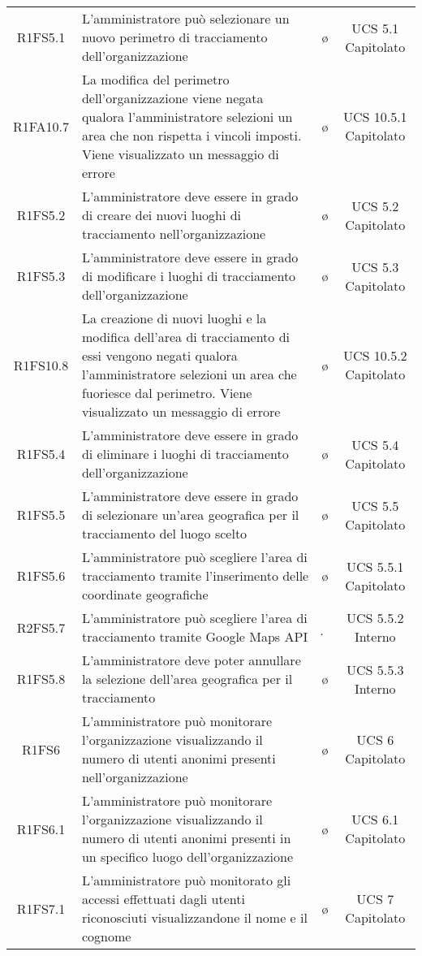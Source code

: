 {\begin{longtable}{ c C{4cm} c c}

R1FS5.1 & L'amministratore può selezionare un nuovo perimetro di tracciamento dell'organizzazione & \o & UCS 5.1 Capitolato\\
R1FA10.7 & La modifica del perimetro dell'organizzazione viene negata qualora l'amministratore selezioni un area che non rispetta i vincoli imposti. Viene visualizzato un messaggio di errore & \o & UCS 10.5.1 Capitolato \\
R1FS5.2 & L'amministratore deve essere in grado di creare dei nuovi luoghi di tracciamento nell'organizzazione & \o & UCS 5.2 Capitolato\\
R1FS5.3 & L'amministratore deve essere in grado di modificare i luoghi di tracciamento dell'organizzazione  & \o & UCS 5.3 Capitolato\\
R1FS10.8 & La creazione di nuovi luoghi e la modifica dell'area di tracciamento di essi vengono negati qualora l'amministratore selezioni un area che fuoriesce dal perimetro. Viene visualizzato un messaggio di errore & \o & UCS 10.5.2 Capitolato \\
R1FS5.4 & L'amministratore deve essere in grado di eliminare i luoghi di tracciamento dell'organizzazione  & \o & UCS 5.4 Capitolato\\
R1FS5.5 & L'amministratore deve essere in grado di selezionare un'area geografica per il tracciamento del luogo scelto  & \o & UCS 5.5 Capitolato\\
R1FS5.6 &  L'amministratore può scegliere l'area di tracciamento tramite l'inserimento delle coordinate geografiche & \o & UCS 5.5.1 Capitolato\\
R2FS5.7 & L'amministratore può scegliere l'area di tracciamento tramite Google Maps API & \d & UCS 5.5.2 Interno\\
R1FS5.8 & L'amministratore deve poter annullare la selezione dell'area geografica per il tracciamento & \o & UCS 5.5.3 Interno\\
R1FS6 & L'amministratore può monitorare l'organizzazione visualizzando il numero di utenti anonimi presenti nell'organizzazione & \o & UCS 6 Capitolato\\
R1FS6.1 & L'amministratore può monitorare l'organizzazione visualizzando il numero di utenti anonimi presenti in un specifico luogo dell'organizzazione  & \o & UCS 6.1 Capitolato\\
R1FS7.1 & L'amministratore può monitorato gli accessi effettuati dagli utenti riconosciuti visualizzandone il nome e il cognome & \o & UCS 7 Capitolato\\

\end{longtable}}
